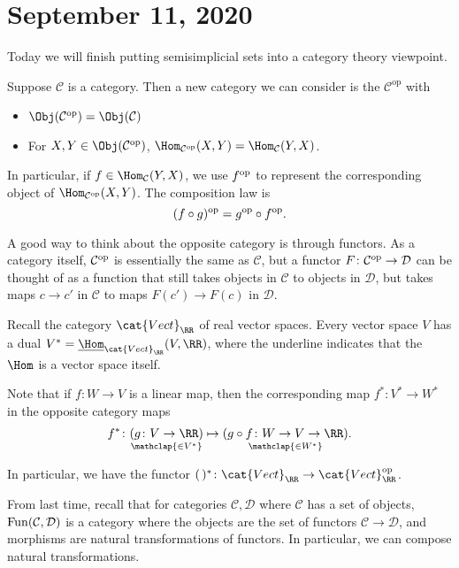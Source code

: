 \documentclass{standalone}
\begin{document}
\chapter{September 11, 2020}
Today we will finish putting semisimplicial sets into
a category theory viewpoint.

Suppose \(\mathcal C\) is a category. Then a new category we can consider is
the  \(\mathcal C^{\mathrm{op}}\) with
\begin{itemize}[nosep]
  \item \(\Obj(\mathcal C^\op) = \Obj(\mathcal C)\)
  \item For \(X, Y \in \Obj(\mathcal C^\op)\),
  \(\Hom_{\mathcal C^\op}(X, Y) = \Hom_{\mathcal C}(Y, X)\).
\end{itemize}
In particular, if \(f \in \Hom_{\mathcal C}(Y, X)\), we use \(f^{\textrm{op}}\)
to represent the corresponding object of \(\Hom_{\mathcal C^\op}(X, Y)\).
The composition law is
\[
  (f \circ g)^{\textrm{op}} = g^{\textrm{op}} \circ f^{\textrm{op}}.
\]

A good way to think about the opposite category is through functors.
As a category itself, \(\mathcal C^{\textrm{op}}\) is essentially the same as
\(\mathcal C\), but a functor \(F \colon \mathcal C^{\textrm{op}} \to \mathcal D\)
can be thought of as a function that still takes objects in \(\mathcal C\)
to objects in \(\mathcal D\), but takes maps \(c \to c'\) in \(\mathcal C\)
to maps \(F(c') \to F(c)\) in \(\mathcal D\).


\begin{example}
  Recall the category \(\cat{Vect}_\RR\) of real vector spaces.
  Every vector space \(V\) has a dual
  \(V^* = \underline{\Hom}_{\cat{Vect}_\RR}(V, \RR)\),
  where the underline indicates that the \(\Hom\) is a vector space itself.

  Note that if \(f \colon W \to V\) is a linear map, then the corresponding
  map \(f^* \colon V^* \to W^*\) in the opposite category maps
  \[
    f^* \colon
    \underset{\mathclap{\in V^*}}{(g \colon V \to \RR)}
    \mapsto
    \underset{\mathclap{\in W^*}}{(g \circ f \colon W \to V \to \RR)}.
  \]
  
  In particular, we have the functor
  \((\,)^* \colon \cat{Vect}_\RR \to \cat{Vect}_\RR^\op\).
\end{example}

From last time, recall that for categories \(\mathcal C, \mathcal D\)
where \(\mathcal C\) has a set of objects, \(\operatorname{Fun}(\mathcal C, \mathcal D)\)
is a category where the objects are the set of functors
\(\mathcal C \to \mathcal D\), and morphisms are
natural transformations of functors. In particular, we can
compose natural transformations.
\end{document}
